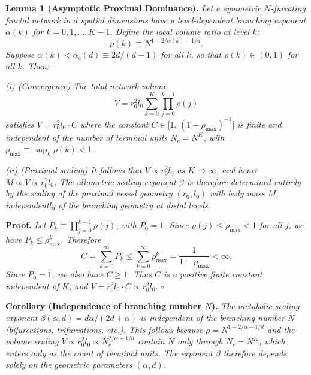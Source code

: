 \documentclass[11pt,a4paper]{article}
\theoremstyle{remark}
\begin{document}
\vspace{0.8em}
\noindent \textbf{Lemma 1 (Asymptotic Proximal Dominance).} \textit{Let a symmetric $N$-furcating fractal network in $d$ spatial dimensions have a level-dependent branching exponent $\alpha(k)$ for $k=0,1,\ldots,K-1$. Define the local volume ratio at level $k$:}
\begin{equation}
\rho(k) \equiv N^{1-2/\alpha(k)-1/d}.
\end{equation}
\textit{Suppose $\alpha(k) < \alpha_c(d) \equiv 2d/(d-1)$ for all $k$, so that $\rho(k) \in (0,1)$ for all $k$. Then:}

\textit{(i) (Convergence) The total network volume}
\begin{equation}
V = r_0^2 l_0 \sum_{k=0}^{K} \prod_{j=0}^{k-1} \rho(j)
\end{equation}
\textit{satisfies $V = r_0^2 l_0 \cdot C$ where the constant $C \in \bigl[1,\, (1-\rho_{\max})^{-1}\bigr]$ is finite and independent of the number of terminal units $N_c = N^K$, with $\rho_{\max} \equiv \sup_k \rho(k) < 1$.}

\textit{(ii) (Proximal scaling) It follows that $V \propto r_0^2 l_0$ as $K \to \infty$, and hence $M \propto V \propto r_0^2 l_0$. The allometric scaling exponent $\beta$ is therefore determined entirely by the scaling of the proximal vessel geometry $(r_0, l_0)$ with body mass $M$, independently of the branching geometry at distal levels.}

\noindent\textbf{Proof.} \textit{Let $P_k \equiv \prod_{j=0}^{k-1}\rho(j)$, with $P_0 = 1$. Since $\rho(j) \leq \rho_{\max} < 1$ for all $j$, we have $P_k \leq \rho_{\max}^k$. Therefore}
\begin{equation*}
C = \sum_{k=0}^{\infty} P_k \leq \sum_{k=0}^{\infty} \rho_{\max}^k =
\frac{1}{1-\rho_{\max}} < \infty.
\end{equation*}
\textit{Since $P_0 = 1$, we also have $C \geq 1$. Thus $C$ is a positive finite constant independent of $K$, and $V = r_0^2 l_0 \cdot C \propto r_0^2 l_0$. $\square$}

\vspace{0.4em}
\noindent\textbf{Corollary (Independence of branching number $N$).} \textit{The metabolic scaling exponent $\beta(\alpha, d) = d\alpha/(2d+\alpha)$ is independent of the branching number $N$ (bifurcations, trifurcations, etc.). This follows because $\rho = N^{1-2/\alpha-1/d}$ and the volume scaling $V \propto r_0^2 l_0 \propto N_c^{2/\alpha+1/d}$ contain $N$ only through $N_c = N^K$, which enters only as the count of terminal units. The exponent $\beta$ therefore depends solely on the geometric parameters $(\alpha, d)$.}
\end{document}
